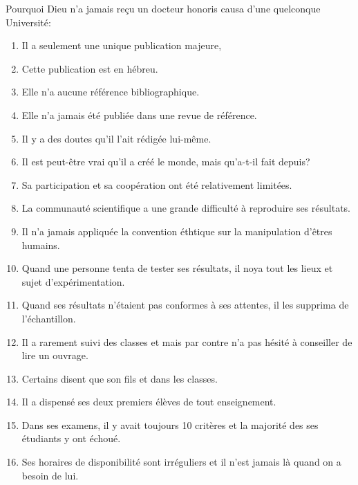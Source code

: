 Pourquoi Dieu n'a jamais reçu un docteur honoris causa d'une quelconque Université:
\begin{enumerate}
	\item Il a seulement une unique publication majeure,

	\item Cette publication est en hébreu.

	\item Elle n'a aucune référence bibliographique.

	\item Elle n'a jamais été publiée dans une revue de référence.

	\item Il y a des doutes qu'il l'ait rédigée lui-même.

	\item  Il est peut-être vrai qu'il a créé le monde, mais qu'a-t-il fait depuis?

	\item Sa participation et sa coopération ont été relativement limitées.

	\item La communauté scientifique a une grande difficulté à reproduire ses résultats.

	\item Il n'a jamais appliquée la convention éthtique sur la manipulation d'êtres humains.

	\item Quand une personne tenta de tester ses résultats, il noya tout les lieux et sujet d'expérimentation.

	\item Quand ses résultats n'étaient pas conformes à ses attentes, il les supprima de l'échantillon.

	\item  Il a rarement suivi des classes et mais par contre n'a pas hésité à conseiller de lire un ouvrage.

	\item Certains disent que son fils et dans les classes.

	\item  Il a dispensé ses deux premiers élèves de tout enseignement.

	\item  Dans ses examens, il y avait toujours 10 critères et la majorité des ses étudiants y ont échoué.

	\item  Ses horaires de disponibilité sont irréguliers et il n'est jamais là quand on a besoin de lui.
\end{enumerate}

